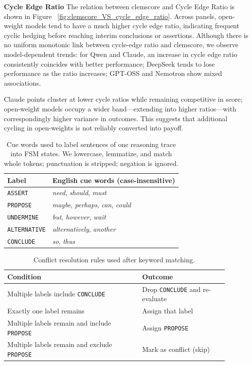 \documentclass[../main.tex]{subfiles}
\begin{document}
\textbf{Cycle Edge Ratio}
The relation between clemscore and Cycle Edge Ratio is shown in Figure ~\ref{fig:clemscore_VS_cycle_edge_ratio}.
Across panels, open-weight models tend to have a much higher cycle edge ratio, indicating frequent cyclic hedging before reaching interim conclusions or assertions. Although there is no uniform monotonic link between cycle-edge ratio and clemscore, we observe model-dependent trends: for Qwen and Claude, an increase in cycle edge ratio consistently coincides with better performance; DeepSeek tends to lose performance as the ratio increases; GPT-OSS and Nemotron show mixed associations. 

Claude points cluster at lower cycle ratios while remaining competitive in score; open-weight models occupy a wider band—extending into higher ratios—with correspondingly higher variance in outcomes. This suggests that additional cycling in open-weights is not reliably converted into payoff. 


\begin{table}[t]
\centering
\small
\setlength{\tabcolsep}{6pt}
\begin{tabular}{ll}
\toprule
\textbf{Label} & \textbf{English cue words (case-insensitive)} \\
\midrule
\texttt{ASSERT}      & \textit{need}, \textit{should}, \textit{must} \\
\texttt{PROPOSE}     & \textit{maybe}, \textit{perhaps}, \textit{can}, \textit{could} \\
\texttt{UNDERMINE}   & \textit{but}, \textit{however}, \textit{wait} \\
\texttt{ALTERNATIVE} & \textit{alternatively}, \textit{another} \\
\texttt{CONCLUDE}    & \textit{so}, \textit{thus} \\
\bottomrule
\end{tabular}
\caption{Cue words used to label sentences of one reasoning trace into FSM states. We lowercase, lemmatize, and match whole tokens; punctuation is stripped; negation is ignored.}
\label{tab:lexical_cues}
\end{table}

\begin{table}[t]
\centering
\small
\begin{tabular}{p{0.55\linewidth} p{0.35\linewidth}}
\toprule
\textbf{Condition} & \textbf{Outcome} \\
\midrule
Multiple labels include \texttt{CONCLUDE} & Drop \texttt{CONCLUDE} and re-evaluate \\
Exactly one label remains & Assign that label \\
Multiple labels remain and include \texttt{PROPOSE} & Assign \texttt{PROPOSE} \\
Multiple labels remain and exclude \texttt{PROPOSE} & Mark as conflict (skip) \\
\bottomrule
\end{tabular}
\caption{Conflict resolution rules used after keyword matching.}
\label{tab:conflict_rules}
\end{table}
\end{document}
